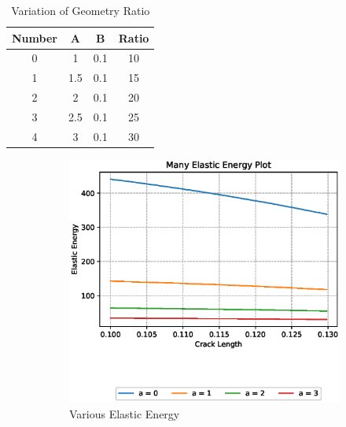 \documentclass[a4paper,11pt]{article}
\begin{document}
\begin{table}[h!]
	\centering
	\begin{tabular}{|c|c|c|c|}
		\hline
		Number	&	A	&	B	&	Ratio	\\
		\hline
		0	&	1	&	0.1	&	10	\\
		1	&	1.5	&	0.1	&	15	\\
		2	&	2	&	0.1	&	20	\\
		3	&	2.5	&	0.1	&	25	\\
		4	&	3	&	0.1	&	30	\\
		\hline
	\end{tabular}
	\caption{Variation of Geometry Ratio}
	\label{tab:gvar}
\end{table}
\begin{figure}[h!]
	\begin{subfigure}[b]{0.49\linewidth}
		\centering
		\includegraphics[width=\linewidth]{picture/conference/manyelastic-gvar}
		\caption{Various Elastic Energy}
		\label{fig:manyelastic-gvar}
	\end{subfigure}
	\begin{subfigure}[b]{0.49\linewidth}
		\centering

\end{subfigure}
\end{figure}
\end{document}
